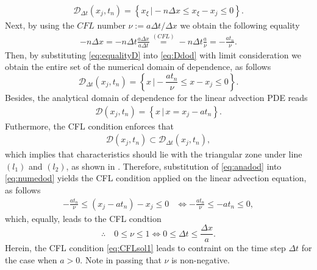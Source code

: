 \documentclass[12pt]{article}
\begin{document}
\begin{enumerate}
	      \begin{align}\label{eq:Ddod}
		      \mathcal{D}_{\Delta t}\left(x_j,t_n\right)
		      =  \left\{ x_{\xi}\, \Big| -n\Delta x \leq x_{\xi} - x_j \leq 0 \right\}.
	      \end{align}
	      Next, by using the $CFL$ number $\nu := a\Delta t/\Delta x$ we obtain the 
	      following equality
	      \begin{align}\label{eq:equalityD}
		      -n\Delta x 
		      = -n\Delta t\frac{a\Delta x}{a \Delta t}
		      \stackrel{(CFL)}{=}
		      -n\Delta t\frac{a}{\nu}
		      = -\frac{at_n}{\nu}.
	      \end{align}
	      Then, by substituting \eqref{eq:equalityD} into \eqref{eq:Ddod}
	      with limit consideration we obtain the entire set of the numerical
	      domain of dependence, as follows 
	      \begin{equation}\label{eq:numedod}
		      \boxed{
			      \mathcal{D}_{\Delta t}\left(x_j,t_n\right)
			      =  \left\{ x \, \Big| -\frac{at_n}{\nu} \leq x - x_j \leq 0 \right\}
		      }.
	      \end{equation}
	      Besides, the analytical domain of dependence for the linear advection PDE reads
	      \begin{align}\label{eq:anadod}
		      \mathcal{D}\left(x_j,t_n\right)
		      =  \left\{ x \, \Big|\, x = x_{j} - at_n \right\} .
	      \end{align}
	      Futhermore, the CFL condition enforces that
	      \begin{align}\label{eq:CFLconditionenforced}
		      \mathcal{D}\left(x_j,t_n\right) \subset \mathcal{D}_{\Delta t}\left(x_j,t_n\right),
	      \end{align}
	      which implies that characteristics should lie with the triangular zone 
	      under line $(l_1)$ and $(l_2)$, as shown in .
	      Therefore, substitution of \eqref{eq:anadod} into \eqref{eq:numedod} yields
	      the CFL condition applied on the linear advection equation, as follows
	      \begin{align}
		      -\frac{at_n}{\nu} \leq \left(x_{j} - at_n\right) - x_j \leq 0 
		       & \Leftrightarrow
		      -\frac{at_n}{\nu} \leq - at_n \leq 0,
	      \end{align}
	      which, equally, leads to the CFL condtion
	      \begin{equation}\label{eq:CFLsol1}
		      \therefore\quad
		      \boxed{
			      0 \leq \nu \leq 1
			      \Leftrightarrow 
			      0 \leq \Delta t \leq \frac{\Delta x}{a}.
		      }
	      \end{equation}
	      Herein, the CFL condition \eqref{eq:CFLsol1} leads to 
	      contraint on the time step $\Delta t$ for the case when $a > 0$.
	      Note in passing that $\nu$ is non-negative.
	      

\end{enumerate}
\end{document}
